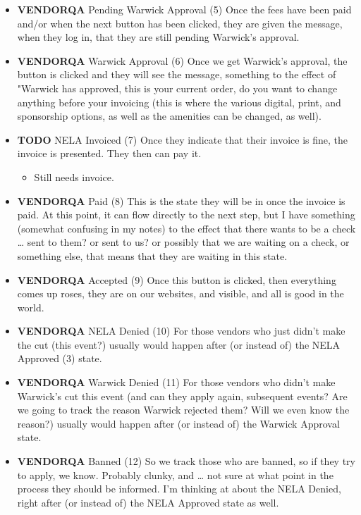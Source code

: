 \documentclass[captions=tablesignature]{scrartcl}
\begin{document}
\begin{itemize}
\item {\bfseries\sffamily VENDORQA} Pending Warwick Approval (5)
\label{sec-3-1-5-4}
Once the fees have been paid and/or when the next button has been
clicked, they are given the message, when they log in, that they
are still pending Warwick's approval.

\item {\bfseries\sffamily VENDORQA} Warwick Approval (6)
\label{sec-3-1-5-5}
Once we get Warwick's approval, the button is clicked and they
will see the message, something to the effect of "Warwick has
approved, this is your current order, do you want to change
anything before your invoicing (this is where the various
digital, print, and sponsorship options, as well as the amenities
can be changed, as well).

\item {\bfseries\sffamily TODO} NELA Invoiced (7)
\label{sec-3-1-5-6}
Once they indicate that their invoice is fine, the invoice is
presented.  They then can pay it.
\begin{itemize}
\item Still needs invoice.
\end{itemize}

\item {\bfseries\sffamily VENDORQA} Paid (8)
\label{sec-3-1-5-7}
This is the state they will be in once the invoice is paid.  At
this point, it can flow directly to the next step, but I have
something (somewhat confusing in my notes) to the effect that
there wants to be a check \ldots{} sent to them? or sent to us? or
possibly that we are waiting on a check, or something else, that
means that they are waiting in this state.

\item {\bfseries\sffamily VENDORQA} Accepted (9)
\label{sec-3-1-5-8}
Once this button is clicked, then everything comes up roses, they
are on our websites, and visible, and all is good in the world.

\item {\bfseries\sffamily VENDORQA} NELA Denied (10)
\label{sec-3-1-5-9}
For those vendors who just didn't make the cut (this event?)
usually would happen after (or instead of) the NELA Approved (3)
state.

\item {\bfseries\sffamily VENDORQA} Warwick Denied (11)
\label{sec-3-1-5-10}
For those vendors who didn't make Warwick's cut this event (and
can they apply again, subsequent events?  Are we going to track
the reason Warwick rejected them?  Will we even know the reason?)
usually would happen after (or instead of) the Warwick Approval
state.

\item {\bfseries\sffamily VENDORQA} Banned (12)
\label{sec-3-1-5-11}
So we track those who are banned, so if they try to apply, we
know.  Probably clunky, and \ldots{} not sure at what point in the
process they should be informed.  I'm thinking at about the NELA
Denied, right after (or instead of) the NELA Approved state as
well.
\end{itemize}
\end{document}
